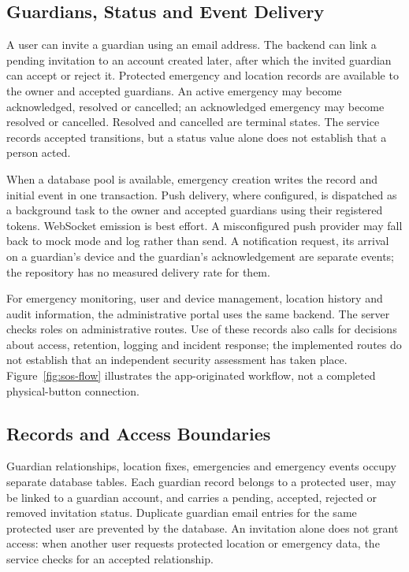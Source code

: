 \documentclass[nolineno]{ieeeaccess}
\begin{document}
\subsection{Guardians, Status and Event Delivery}
A user can invite a guardian using an email address. The backend can link a pending invitation to an account created later, after which the invited guardian can accept or reject it. Protected emergency and location records are available to the owner and accepted guardians. An active emergency may become acknowledged, resolved or cancelled; an acknowledged emergency may become resolved or cancelled. Resolved and cancelled are terminal states. The service records accepted transitions, but a status value alone does not establish that a person acted.

When a database pool is available, emergency creation writes the record and initial event in one transaction. Push delivery, where configured, is dispatched as a background task to the owner and accepted guardians using their registered tokens. WebSocket emission is best effort. A misconfigured push provider may fall back to mock mode and log rather than send. A notification request, its arrival on a guardian's device and the guardian's acknowledgement are separate events; the repository has no measured delivery rate for them.

For emergency monitoring, user and device management, location history and audit information, the administrative portal uses the same backend. The server checks roles on administrative routes. Use of these records also calls for decisions about access, retention, logging and incident response; the implemented routes do not establish that an independent security assessment has taken place. Figure~\ref{fig:sos-flow} illustrates the app-originated workflow, not a completed physical-button connection.


\subsection{Records and Access Boundaries}
Guardian relationships, location fixes, emergencies and emergency events occupy separate database tables. Each guardian record belongs to a protected user, may be linked to a guardian account, and carries a pending, accepted, rejected or removed invitation status. Duplicate guardian email entries for the same protected user are prevented by the database. An invitation alone does not grant access: when another user requests protected location or emergency data, the service checks for an accepted relationship.
\end{document}
